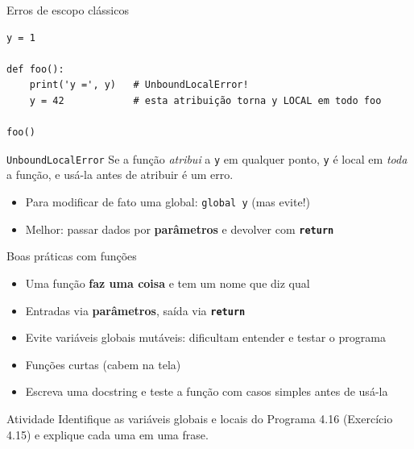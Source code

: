 \documentclass[aspectratio=169,10pt,t]{beamer}
\begin{document}
\begin{frame}[fragile]{Erros de escopo clássicos}
\begin{lstlisting}[basicstyle=\ttfamily\scriptsize]
y = 1

def foo():
    print('y =', y)   # UnboundLocalError!
    y = 42            # esta atribuição torna y LOCAL em todo foo

foo()
\end{lstlisting}
  \begin{alertblock}{\texttt{UnboundLocalError}}
    Se a função \emph{atribui} a \texttt{y} em qualquer ponto, \texttt{y} é local em \emph{toda} a função, e usá-la antes de atribuir é um erro.
  \end{alertblock}
  \begin{itemize}
    \item Para modificar de fato uma global: \texttt{global y} (mas \alert{evite}!)
    \item Melhor: passar dados por \textbf{parâmetros} e devolver com \textbf{\texttt{return}}
  \end{itemize}
\end{frame}

\begin{frame}{Boas práticas com funções}
  \begin{itemize}
    \item Uma função \textbf{faz uma coisa} e tem um nome que diz qual
    \item Entradas via \textbf{parâmetros}, saída via \textbf{\texttt{return}}
    \item Evite variáveis globais mutáveis: dificultam entender e testar o programa
    \item Funções curtas (cabem na tela)
    \item Escreva uma docstring e teste a função com casos simples antes de usá-la
  \end{itemize}
  \begin{exampleblock}{Atividade}
    Identifique as variáveis globais e locais do Programa 4.16 (Exercício 4.15) e explique cada uma em uma frase.
  \end{exampleblock}
\end{frame}

\end{document}
